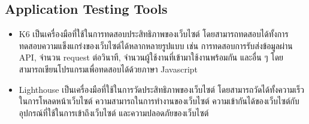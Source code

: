 \documentclass[12pt,oneside,openright,a4paper]{cpe-thai-project}
\begin{document}
  \subsection{Application Testing Tools}
    \begin{itemize}
      \item K6
        \hspace{1cm}เป็นเครื่องมือที่ใช้ในการทดสอบประสิทธิภาพของเว็บไซต์ โดยสามารถทดสอบได้ทั้งการทดสอบความแข็งแกร่งของเว็บไซต์ได้หลากหลายรูปแบบ เช่น 
        การทดสอบการรับส่งข้อมูลผ่าน API, จำนวน request ต่อวินาที, จำนวนผู้ใช้งานที่เข้ามาใช้งานพร้อมกัน และอื่น ๆ โดยสามารถเขียนโปรแกรมเพื่อทดสอบได้ด้วยภาษา Javascript \cite{k6}

      \item Lighthouse
        \hspace{1cm}เป็นเครื่องมือที่ใช้ในการวัดประสิทธิภาพของเว็บไซต์ โดยสามารถวัดได้ทั้งความเร็วในการโหลดหน้าเว็บไซต์ ความสามารถในการทำงานของเว็บไซต์ ความเข้ากันได้ของเว็บไซต์กับอุปกรณ์ที่ใช้ในการเข้าถึงเว็บไซต์ 
        และความปลอดภัยของเว็บไซต์ \cite{lighthouse}
      





\end{itemize}
\end{document}
